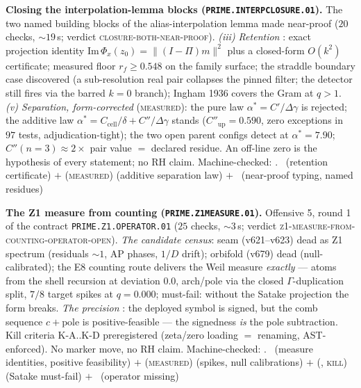 \documentclass[11pt,a4paper]{article}
\theoremstyle{definition}
\begin{document}
\par\smallskip\noindent\textbf{Closing the interpolation-lemma
blocks (\texttt{PRIME.INTERPCLOSURE.01}).}
The two named building blocks of the alias-interpolation lemma made
near-proof ($20$ checks, ${\sim}19$\,s; verdict
\textsc{closure-both-near-proof}).  \emph{(iii) Retention} \mE:
exact projection identity $\mathrm{Im}\,\Phi_x(z_0)=\|(I-\Pi)m\|^2$
plus a closed-form $O(k^2)$ certificate; measured floor
$r_f\ge0.548$ on the family surface; the straddle boundary case
discovered (a sub-resolution real pair collapses the pinned filter;
the detector still fires via the barred $k=0$ branch); Ingham 1936
covers the Gram at $q>1$.  \emph{(v) Separation, form-corrected}
(\textsc{measured}): the pure law $\alpha^*=C'/\Delta\gamma$ is
rejected; the additive law
$\alpha^*=C_{\mathrm{cell}}/\delta+C''/\Delta\gamma$ stands
($C''_{\mathrm{up}}=0.590$, zero exceptions in $97$ tests,
adjudication-tight); the two open parent configs detect at
$\alpha^*=7.90$; $C''(n{=}3)\approx2\times$ pair value $=$ declared
residue.  An off-line zero is the hypothesis of every statement; no
RH claim.
Machine-checked: .
\mE\ (retention certificate) $+$ (\textsc{measured}) (additive
separation law) $+$ \mC\ (near-proof typing, named residues)
\par\smallskip

\par\smallskip\noindent\textbf{The Z1 measure from counting
(\texttt{PRIME.Z1MEASURE.01}).}
Offensive 5, round 1 of the contract \texttt{PRIME.Z1.OPERATOR.01}
($25$ checks, ${\sim}3$\,s; verdict
\textsc{z1-measure-from-counting-operator-open}).  \emph{The
candidate census}: seam (v621--v623) dead as Z1 spectrum (residuals
${\sim}1$, AP phases, $1/D$ drift); orbifold (v679) dead
(null-calibrated); the E8 counting route delivers the Weil measure
\emph{exactly} --- atoms from the shell recursion at deviation
$0.0$, arch/pole via the closed $\Gamma$-duplication split, $7/8$
target spikes at $q=0.000$; must-fail: without the Satake projection
the form breaks.  \emph{The precision} \mE: the deployed symbol is
signed, but the comb sequence $c+\mathrm{pole}$ is
positive-feasible --- the signedness \emph{is} the pole subtraction.
Kill criteria K-A..K-D preregistered (zeta/zero loading $=$
renaming, AST-enforced).  No marker move, no RH claim.
Machine-checked: .
\mE\ (measure identities, positive feasibility) $+$
(\textsc{measured}) (spikes, null calibrations) $+$ (\mE,
\textsc{kill}) (Satake must-fail) $+$ \mO\ (operator missing)
\par\smallskip
\end{document}
